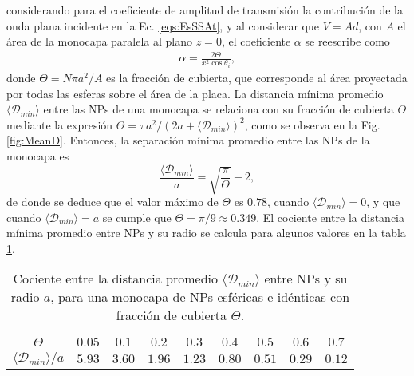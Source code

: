 \noindent considerando para el coeficiente de amplitud de transmisión la contribución de la onda plana incidente en la Ec. \eqref{eqs:EsSSAt}, y al considerar que $V = A d$, con $A$ el área de la monocapa paralela al plano $z=0$, el coeficiente $\alpha$ se reescribe como
%
	\begin{align}
	\alpha = \frac{2\Theta}{x^2 \cos\theta_i},
	\label{eq:alpha}
	\end{align}
%
donde $\Theta = N \pi a^2 / A$ es la fracción de cubierta, que corresponde al área proyectada por todas las esferas sobre el área de la placa. La distancia mínima promedio $\langle\mathscr{D}_{min}\rangle$ entre las NPs de una monocapa se relaciona con su fracción de cubierta $\Theta$ mediante la expresión $\Theta = \pi a^2 / (2a+\langle\mathscr{D}_{min}\rangle)^2$, como se observa en la Fig. \ref{fig:MeanD}. Entonces, la separación mínima promedio entre las NPs de la monocapa es
%
	\begin{equation}
	\frac{\langle\mathscr{D}_{min}\rangle}{a} = \sqrt{\frac{\pi}{\Theta}}-2,
	\label{eq:MeanD}
	\end{equation}
%
de donde se deduce que el valor máximo de $\Theta$ es $0.78$, cuando $\langle\mathscr{D}_{min}\rangle=0$, y que cuando $\langle\mathscr{D}_{min}\rangle= a$ se cumple que $\Theta = \pi/9\approx 0.349$. El cociente entre la distancia mínima promedio entre NPs y su radio se calcula para algunos valores en la tabla  \ref{tab:meanD}.

\begin{table}[h!] \centering
	\caption{Cociente entre la distancia promedio $\langle\mathscr{D}_{min}\rangle$ entre NPs y su radio $a$, para una monocapa de NPs esféricas e idénticas con fracción de cubierta $\Theta$.}
	\label{tab:meanD}\vspace*{-1em}
	\begin{tabular}{c || c c c c c c c c}
	\hline \hline
	$\Theta$ & $0.05$ & $0.1$ & $0.2$ & $0.3$ & $0.4$ & $0.5$ & $0.6$ & $0.7$\\
 \hline 
	$\langle\mathscr{D}_{min}\rangle / a $& $5.93$ & $3.60$ & $1.96$ & $1.23$ & $0.80$ & $0.51$ & $0.29$ & $0.12$ \\
	\hline \hline
	\end{tabular} 
\end{table}

